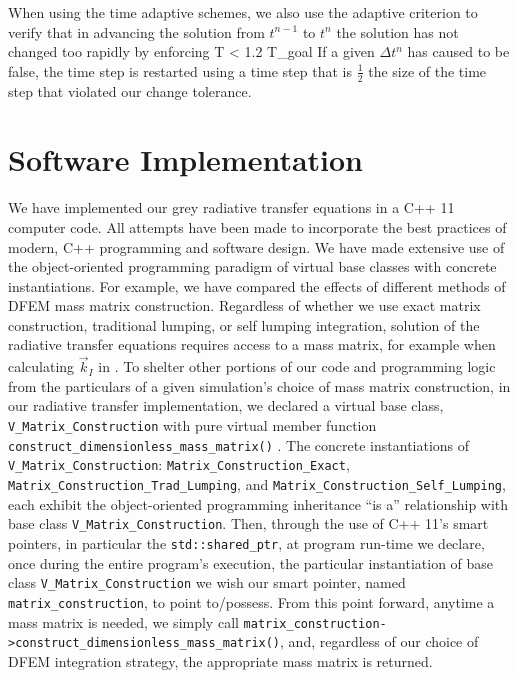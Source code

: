 When using the time adaptive schemes, we also use the adaptive criterion to verify that in advancing the solution from $t^{n-1}$ to $t^n$ the solution has not changed too rapidly by enforcing
\benum
\Delta T < 1.2 \Delta T_{goal} \pep
\label{eq:eos_check}
\eenum
If a given $\Delta t^n$ has caused  to be false, the time step is restarted using a time step that is $\frac{1}{2}$ the size of the time step that violated our change tolerance.

 
\section{Software Implementation}
\label{sec:chap6_programming}

We have implemented our grey radiative transfer equations in a C++ 11 computer code.
All attempts have been made to incorporate the best practices of modern, C++ programming and software design\cite{cpp_book,effective_cpp}.
We have made extensive use of the object-oriented programming paradigm of virtual base classes with concrete instantiations.
For example, we have compared the effects of different methods of DFEM mass matrix construction.
Regardless of whether we use exact matrix construction, traditional lumping, or self lumping integration, solution of the radiative transfer equations requires access to a mass matrix, for example when calculating $\vec{k}_I$ in .
To shelter other portions of our code and programming logic from the particulars of a given simulation's choice of mass matrix construction, in our radiative transfer implementation, we declared a virtual base class, \verb+V_Matrix_Construction+ with pure virtual member function \verb+construct_dimensionless_mass_matrix()+ .
The concrete instantiations of \verb+V_Matrix_Construction+: \verb+Matrix_Construction_Exact+, \verb+Matrix_Construction_Trad_Lumping+, and \verb+Matrix_Construction_Self_Lumping+, each exhibit the object-oriented programming inheritance ``is a'' relationship with base class \verb+V_Matrix_Construction+.
Then, through the use of C++ 11's smart pointers, in particular the \verb+std::shared_ptr+,  at program run-time we declare, once during the entire program's execution, the particular instantiation of base class \verb+V_Matrix_Construction+  we wish our smart pointer, named \verb+matrix_construction+, to point to/possess.
From this point forward, anytime a mass matrix is needed, we simply call \verb+matrix_construction->construct_dimensionless_mass_matrix()+, and, regardless of our choice of DFEM integration strategy, the appropriate mass matrix is returned.

